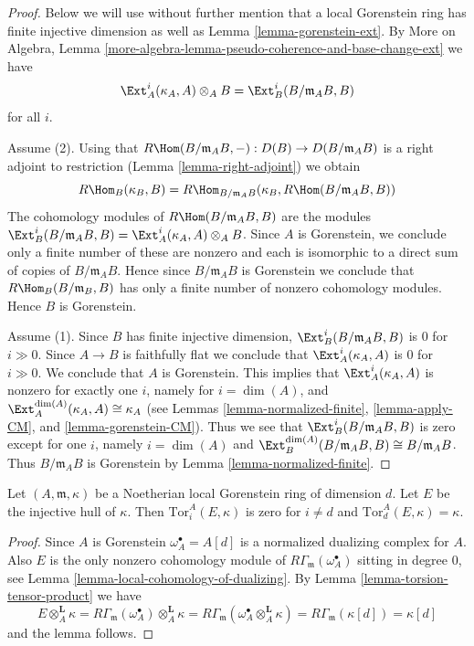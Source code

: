 \begin{proof}
Below we will use without further mention that a local Gorenstein ring
has finite injective dimension as well as Lemma \ref{lemma-gorenstein-ext}.
By More on Algebra, Lemma
\ref{more-algebra-lemma-pseudo-coherence-and-base-change-ext}
we have
$$
\Ext^i_A(\kappa_A, A) \otimes_A B =
\Ext^i_B(B/\mathfrak m_A B, B)
$$
for all $i$.

\medskip\noindent
Assume (2). Using that
$R\Hom(B/\mathfrak m_A B, -) : D(B) \to D(B/\mathfrak m_A B)$ is a
right adjoint to restriction (Lemma \ref{lemma-right-adjoint}) we obtain
$$
R\Hom_B(\kappa_B, B) =
R\Hom_{B/\mathfrak m_A B}(\kappa_B, R\Hom(B/\mathfrak m_A B, B))
$$
The cohomology modules of $R\Hom(B/\mathfrak m_A B, B)$ are the modules
$\Ext^i_B(B/\mathfrak m_A B, B) =
\Ext^i_A(\kappa_A, A) \otimes_A B$.
Since $A$ is Gorenstein, we conclude only a finite number of these are nonzero
and each is isomorphic to a direct sum of copies of $B/\mathfrak m_A B$.
Hence since $B/\mathfrak m_A B$ is Gorenstein we conclude that
$R\Hom_B(B/\mathfrak m_B, B)$ has only a finite number of nonzero
cohomology modules. Hence $B$ is Gorenstein.

\medskip\noindent
Assume (1). Since $B$ has finite injective dimension,
$\Ext^i_B(B/\mathfrak m_A B, B)$ is $0$ for $i \gg 0$.
Since $A \to B$ is faithfully flat
we conclude that $\Ext^i_A(\kappa_A, A)$ is $0$
for $i \gg 0$. We conclude that $A$ is Gorenstein. This implies that
$\Ext^i_A(\kappa_A, A)$ is nonzero for exactly one $i$,
namely for $i = \dim(A)$, and
$\Ext^{\dim(A)}_A(\kappa_A, A) \cong \kappa_A$
(see Lemmas \ref{lemma-normalized-finite}, \ref{lemma-apply-CM}, and
\ref{lemma-gorenstein-CM}).
Thus we see that
$\Ext^i_B(B/\mathfrak m_A B, B)$ is zero except for one $i$,
namely $i = \dim(A)$ and
$\Ext^{\dim(A)}_B(B/\mathfrak m_A B, B) \cong B/\mathfrak m_A B$.
Thus $B/\mathfrak m_A B$ is Gorenstein by
Lemma \ref{lemma-normalized-finite}.
\end{proof}

\begin{lemma}
\label{lemma-tor-injective-hull}
Let $(A, \mathfrak m, \kappa)$ be a Noetherian local Gorenstein ring
of dimension $d$. Let $E$ be the injective hull of $\kappa$. Then
$\text{Tor}_i^A(E, \kappa)$ is zero for $i \not = d$
and $\text{Tor}_d^A(E, \kappa) = \kappa$.
\end{lemma}

\begin{proof}
Since $A$ is Gorenstein $\omega_A^\bullet = A[d]$ is a
normalized dualizing complex for $A$.
Also $E$ is the only nonzero cohomology module of
$R\Gamma_\mathfrak m(\omega_A^\bullet)$ sitting in degree $0$, see
Lemma \ref{lemma-local-cohomology-of-dualizing}.
By Lemma \ref{lemma-torsion-tensor-product} we have
$$
E \otimes_A^\mathbf{L} \kappa =
R\Gamma_\mathfrak m(\omega_A^\bullet) \otimes_A^\mathbf{L} \kappa =
R\Gamma_\mathfrak m(\omega_A^\bullet \otimes_A^\mathbf{L} \kappa) =
R\Gamma_\mathfrak m(\kappa[d]) = \kappa[d]
$$
and the lemma follows.
\end{proof}




